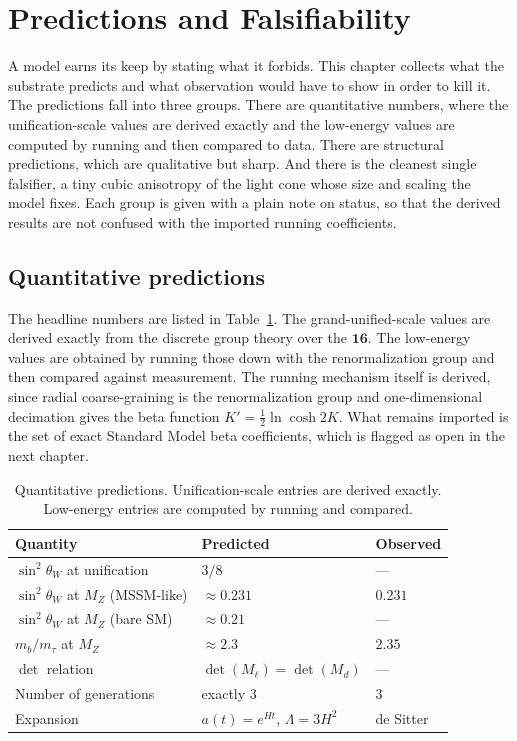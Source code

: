 \section{Predictions and Falsifiability}

A model earns its keep by stating what it forbids. This chapter collects what the substrate predicts and what observation would have to show in order to kill it. The predictions fall into three groups. There are quantitative numbers, where the unification-scale values are derived exactly and the low-energy values are computed by running and then compared to data. There are structural predictions, which are qualitative but sharp. And there is the cleanest single falsifier, a tiny cubic anisotropy of the light cone whose size and scaling the model fixes. Each group is given with a plain note on status, so that the derived results are not confused with the imported running coefficients.

\subsection{Quantitative predictions}

The headline numbers are listed in Table~\ref{tab:quant-predictions}. The grand-unified-scale values are derived exactly from the discrete group theory over the $\mathbf{16}$. The low-energy values are obtained by running those down with the renormalization group and then compared against measurement. The running mechanism itself is derived, since radial coarse-graining is the renormalization group and one-dimensional decimation gives the beta function $K' = \tfrac{1}{2}\ln\cosh 2K$. What remains imported is the set of exact Standard Model beta coefficients, which is flagged as open in the next chapter.

\begin{table}[h]
\centering
\begin{tabular}{@{}lll@{}}
\toprule
Quantity & Predicted & Observed \\
\midrule
$\sin^2\theta_W$ at unification & $3/8$ & --- \\
$\sin^2\theta_W$ at $M_Z$ (MSSM-like) & $\approx 0.231$ & $0.231$ \\
$\sin^2\theta_W$ at $M_Z$ (bare SM) & $\approx 0.21$ & --- \\
$m_b/m_\tau$ at $M_Z$ & $\approx 2.3$ & $2.35$ \\
$\det$ relation & $\det(M_{\ell}) = \det(M_d)$ & --- \\
Number of generations & exactly $3$ & $3$ \\
Expansion & $a(t) = e^{Ht}$, $\Lambda = 3H^2$ & de Sitter \\
\bottomrule
\end{tabular}
\caption{Quantitative predictions. Unification-scale entries are derived exactly. Low-energy entries are computed by running and compared.}
\label{tab:quant-predictions}
\end{table}


